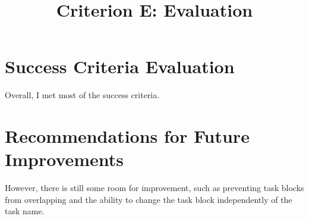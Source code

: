 \documentclass[12pt]{report}
\title{Criterion E: Evaluation}
\begin{document}
\centerline{\textcolor{msblue}{
		\textbf{\fontsize{13}{13}\MyTitle}
	}}



\section*{Success Criteria Evaluation}

Overall, I met most of the success criteria.

\section*{Recommendations for Future Improvements}
However, there is still some room for improvement, such as preventing task blocks from overlapping and the ability to change the task block independently of the task name.
\end{document}
